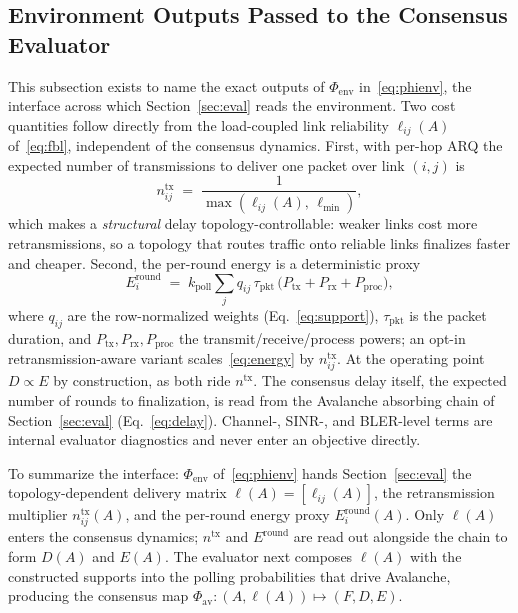 \documentclass[journal]{IEEEtran}
\newcommand{\kpoll}{\ensuremath{k_{\mathrm{poll}}}}      %
\begin{document}
\subsection{Environment Outputs Passed to the Consensus Evaluator}\label{sub:de}

This subsection exists to name the exact outputs of $\Phi_{\mathrm{env}}$
in~\eqref{eq:phienv}, the interface across which Section~\ref{sec:eval} reads the
environment. Two cost quantities follow directly from the load-coupled link
reliability $\ell_{ij}(A)$ of~\eqref{eq:fbl}, independent of the consensus
dynamics. First, with per-hop ARQ the expected number of transmissions to deliver
one packet over link $(i,j)$ is
\begin{equation}
  n^{\mathrm{tx}}_{ij} \;=\; \frac{1}{\max\!\left(\ell_{ij}(A),\,\ell_{\min}\right)},
  \label{eq:ntx}
\end{equation}
which makes a \emph{structural} delay topology-controllable: weaker links cost
more retransmissions, so a topology that routes traffic onto reliable links
finalizes faster and cheaper. Second, the per-round energy is a deterministic
proxy
\begin{equation}
  E^{\mathrm{round}}_i \;=\; \kpoll\sum_{j} q_{ij}\,\tau_{\mathrm{pkt}}\,
  \big(P_{\mathrm{tx}}+P_{\mathrm{rx}}+P_{\mathrm{proc}}\big),
  \label{eq:energy}
\end{equation}
where $q_{ij}$ are the row-normalized weights (Eq.~\eqref{eq:support}),
$\tau_{\mathrm{pkt}}$ is the packet duration, and
$P_{\mathrm{tx}},P_{\mathrm{rx}},P_{\mathrm{proc}}$ the transmit/receive/process
powers; an opt-in retransmission-aware variant scales~\eqref{eq:energy} by
$n^{\mathrm{tx}}_{ij}$. At the operating point $D\propto E$ by construction, as
both ride $n^{\mathrm{tx}}$. The consensus delay itself, the expected number of
rounds to finalization, is read from the Avalanche absorbing chain of
Section~\ref{sec:eval} (Eq.~\eqref{eq:delay}). Channel-, SINR-, and BLER-level
terms are internal evaluator diagnostics and never enter an objective directly.

To summarize the interface: $\Phi_{\mathrm{env}}$ of~\eqref{eq:phienv} hands
Section~\ref{sec:eval} the topology-dependent delivery matrix
$\boldsymbol{\ell}(A)=[\ell_{ij}(A)]$, the retransmission multiplier
$n^{\mathrm{tx}}_{ij}(A)$, and the per-round energy proxy
$E^{\mathrm{round}}_i(A)$. Only $\boldsymbol{\ell}(A)$ enters the consensus
dynamics; $n^{\mathrm{tx}}$ and $E^{\mathrm{round}}$ are read out alongside the
chain to form $D(A)$ and $E(A)$. The evaluator next composes $\boldsymbol{\ell}(A)$
with the constructed supports into the polling probabilities that drive
Avalanche, producing the consensus map $\Phi_{\mathrm{av}}:(A,\boldsymbol{\ell}(A))\mapsto(F,D,E)$.
\end{document}
